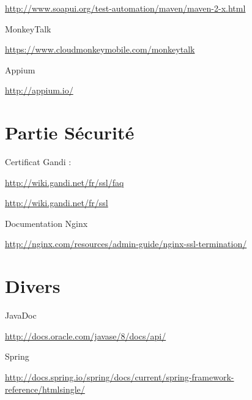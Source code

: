\url{http://www.soapui.org/test-automation/maven/maven-2-x.html}

MonkeyTalk

\url{https://www.cloudmonkeymobile.com/monkeytalk}

Appium

\url{http://appium.io/}

\section{Partie Sécurité}

Certificat Gandi :

\url{http://wiki.gandi.net/fr/ssl/faq}

\url{http://wiki.gandi.net/fr/ssl}


Documentation Nginx

\url{http://nginx.com/resources/admin-guide/nginx-ssl-termination/}

\section{Divers}


JavaDoc

\url{http://docs.oracle.com/javase/8/docs/api/}

Spring

\url{http://docs.spring.io/spring/docs/current/spring-framework-reference/htmlsingle/}